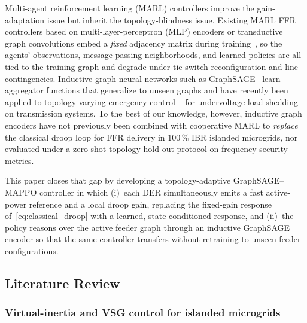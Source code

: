 \documentclass[lettersize,journal]{IEEEtran}
\begin{document}
Multi-agent reinforcement learning (MARL) controllers improve the gain-adaptation issue but inherit the topology-blindness issue. Existing MARL FFR controllers based on multi-layer-perceptron (MLP) encoders or transductive graph convolutions embed a \emph{fixed} adjacency matrix during training~\cite{wang2025mappo,qiu2023hierarchical,wang2023graphppo,guo2024gcnnppo,guo2024ldlfc,shi2025coordvpp}, so the agents' observations, message-passing neighborhoods, and learned policies are all tied to the training graph and degrade under tie-switch reconfiguration and line contingencies. Inductive graph neural networks such as GraphSAGE~\cite{hamilton2017graphsage} learn aggregator functions that generalize to unseen graphs and have recently been applied to topology-varying emergency control ~\cite{pei2023graphsage} for undervoltage load shedding on transmission systems. To the best of our knowledge, however, inductive graph encoders have not previously been combined with cooperative MARL to \emph{replace} the classical droop loop for FFR delivery in $100$\,\% IBR islanded microgrids, nor evaluated under a zero-shot topology hold-out protocol on frequency-security metrics.

This paper closes that gap by developing a topology-adaptive GraphSAGE--MAPPO controller in which (i)~each DER simultaneously emits a fast active-power reference and a local droop gain, replacing the fixed-gain response of~\eqref{eq:classical_droop} with a learned, state-conditioned response, and (ii)~the policy reasons over the active feeder graph through an inductive GraphSAGE encoder so that the same controller transfers without retraining to unseen feeder configurations.

\subsection{Literature Review}
\label{ssec:litreview}

\subsubsection{Virtual-inertia and VSG control for islanded microgrids}
\end{document}
